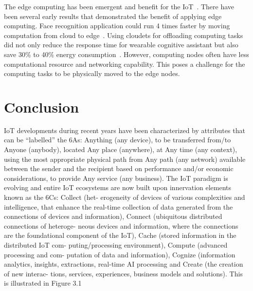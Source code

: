 The edge computing has been emergent and benefit for the IoT~\citep{Yu:2018}. 
There have been several early results that demonstrated the benefit of applying edge computing. 
Face recognition application could run 4 times faster by moving computation from cloud to edge~\citep{Yi:2015}.
Using cloudets for offloading computing tasks did not only reduce the response time for wearable cognitive assistant but also save 30$\%$ to 40$\%$ energy consumption~\citep{Ha:2014}. 
However, computing nodes often have less computational resource and networking capability. 
This poses a challenge for the computing tasks to be physically moved to the edge nodes.












\section{Conclusion}

IoT developments during recent years have been characterized by
attributes that can be “labelled” the 6As: Anything (any device), to be
transferred from/to Anyone (anybody), located Any place (anywhere), at
Any time (any context), using the most appropriate physical path from Any
path (any network) available between the sender and the recipient based
on performance and/or economic considerations, to provide Any service
(any business). The IoT paradigm is evolving and entire IoT ecosystems
are now built upon innervation elements known as the 6Cs: Collect (het-
erogeneity of devices of various complexities and intelligence, that enhance
the real-time collection of data generated from the connections of devices
and information), Connect (ubiquitous distributed connections of heteroge-
neous devices and information, where the connections are the foundational
component of the IoT), Cache (stored information in the distributed IoT com-
puting/processing environment), Compute (advanced processing and com-
putation of data and information), Cognize (information analytics, insights,
extractions, real-time AI processing and Create (the creation of new interac-
tions, services, experiences, business models and solutions). This is illustrated
in Figure 3.1






















